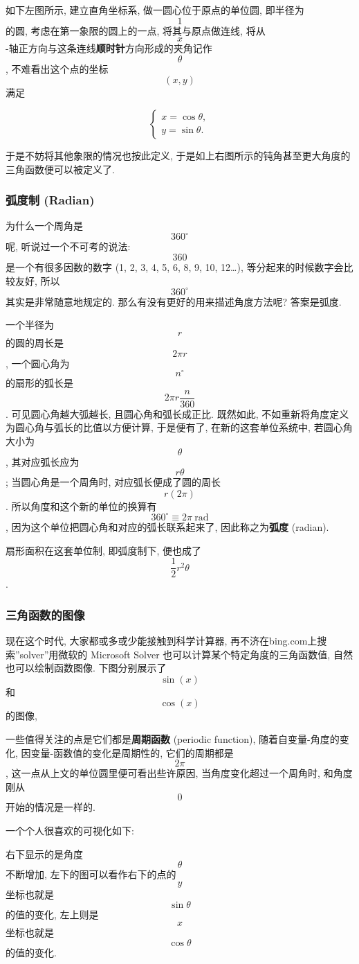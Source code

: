 如下左图所示, 建立直角坐标系, 做一圆心位于原点的单位圆, 即半径为 \[1\]
的圆, 考虑在第一象限的圆上的一点, 将其与原点做连线, 将从
\[x\]-轴正方向与这条连线\textbf{顺时针}方向形成的夹角记作 \[\theta\],
不难看出这个点的坐标 \[(x,y)\] 满足

\[\begin{cases}x=\cos\theta,\\y=\sin\theta.\end{cases}\]

于是不妨将其他象限的情况也按此定义,
于是如上右图所示的钝角甚至更大角度的三角函数便可以被定义了.

\hypertarget{ux5f27ux5ea6ux5236-radian}{%
\subsubsection{弧度制 (Radian)}\label{ux5f27ux5ea6ux5236-radian}}

为什么一个周角是 \[360^\circ\] 呢, 听说过一个不可考的说法: \[360\]
是一个有很多因数的数字 (1, 2, 3, 4, 5, 6, 8, 9, 10, 12\ldots),
等分起来的时候数字会比较友好, 所以 \[360^\circ\] 其实是非常随意地规定的.
那么有没有更好的用来描述角度方法呢? 答案是弧度.

一个半径为 \[r\] 的圆的周长是 \[2\pi r\], 一个圆心角为 \[n^\circ\]
的扇形的弧长是 \[2\pi r\frac{n}{360}\]. 可见圆心角越大弧越长,
且圆心角和弧长成正比. 既然如此,
不如重新将角度定义为圆心角与弧长的比值以方便计算, 于是便有了,
在新的这套单位系统中, 若圆心角大小为 \[\theta\], 其对应弧长应为
\[r\theta\]; 当圆心角是一个周角时, 对应弧长便成了圆的周长 \[r(2\pi)\].
所以角度和这个新的单位的换算有 \[360^\circ\equiv 2\pi\ \text{rad}\],
因为这个单位把圆心角和对应的弧长联系起来了, 因此称之为\textbf{弧度}
(radian).

扇形面积在这套单位制, 即弧度制下, 便也成了 \[\frac{1}{2}r^2\theta\].

\hypertarget{ux4e09ux89d2ux51fdux6570ux7684ux56feux50cf}{%
\subsubsection{三角函数的图像}\label{ux4e09ux89d2ux51fdux6570ux7684ux56feux50cf}}

现在这个时代, 大家都或多或少能接触到科学计算器,
再不济在bing.com上搜索''solver''用微软的 Microsoft Solver
也可以计算某个特定角度的三角函数值, 自然也可以绘制函数图像.
下图分别展示了 \[\sin(x)\] 和 \[\cos(x)\] 的图像,

一些值得关注的点是它们都是\textbf{周期函数} (periodic function),
随着自变量-角度的变化, 因变量-函数值的变化是周期性的, 它们的周期都是
\[2\pi\], 这一点从上文的单位圆里便可看出些许原因,
当角度变化超过一个周角时, 和角度刚从 \[0\] 开始的情况是一样的.

一个个人很喜欢的可视化如下:

右下显示的是角度 \[\theta\] 不断增加, 左下的图可以看作右下的点的 \[y\]
坐标也就是 \[\sin\theta\] 的值的变化, 左上则是 \[x\] 坐标也就是
\[\cos\theta\] 的值的变化.

